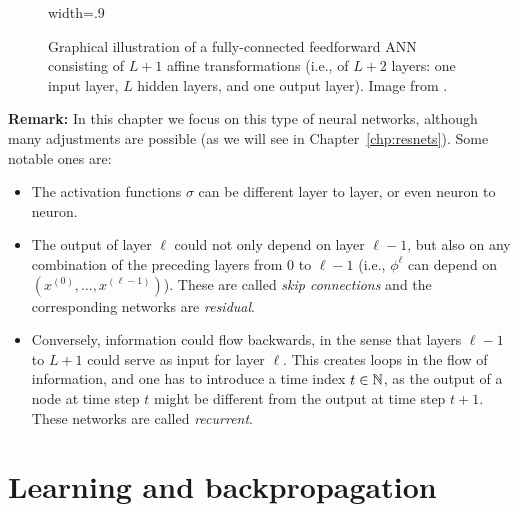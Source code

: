 \begin{figure}
    \centering
    \begin{adjustbox}{width=.9\textwidth}
        
    \end{adjustbox}
\caption{\label{fig:deepANN}Graphical illustration of a fully-connected feedforward ANN consisting of
$L+1$ affine transformations (i.e., of $L+2$ layers: one input layer, $L$ hidden layers, and one output layer). Image from \cite{jentzenMathematical2023}.}
\end{figure}

\textbf{Remark: }
In this chapter we focus on this type of neural networks, although many adjustments are possible (as we will see in Chapter~\ref{chp:resnets}).
Some notable ones are:
\begin{itemize}
    \item The activation functions $\sigma$ can be different layer to layer, or even neuron to neuron.
    \item The output of layer $\ell$ could not only depend on layer $\ell-1$, but also on any combination of the preceding layers from $0$ to $\ell-1$ (i.e., $\phi^\ell$ can depend on $(x^{(0)},\ldots, x^{(\ell-1)})$). These are called \emph{skip connections} and the corresponding networks are \emph{residual}.
    \item Conversely, information could flow backwards, in the sense that layers $\ell-1$ to $L+1$ could serve as input for layer $\ell$. This creates loops in the flow of information, and one has to introduce a time index $t\in \mathbb{N}$, as the output of a node at time step $t$ might be different from the output at time step $t+1$. These networks are called \emph{recurrent}.
\end{itemize}


\section{Learning and backpropagation}

